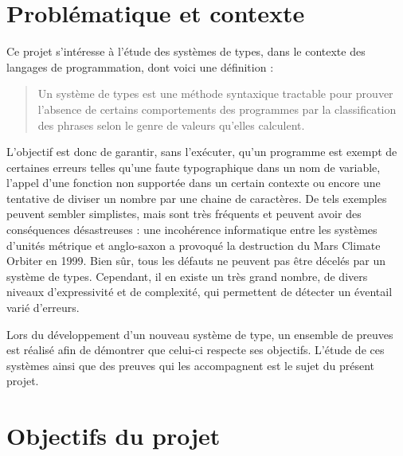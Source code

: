 \documentclass[a4paper, oneside, 12pt, titlepage]{article}
\begin{document}
\pagestyle{empty}
\tableofcontents

\cleardoublepage
{}

\section{Problématique et contexte}


Ce projet s'intéresse à l'étude des systèmes de types, dans le contexte des langages de
programmation, dont voici une définition \cite{pierce2002} :

\begin{quotation}
  Un système de types est une méthode syntaxique tractable pour prouver l'absence de certains
  comportements des programmes par la classification des phrases selon le genre de valeurs qu'elles
  calculent.
\end{quotation}

L'objectif est donc de garantir, sans l'exécuter, qu'un programme est exempt de certaines erreurs
telles qu'une faute typographique dans un nom de variable, l'appel d'une fonction non supportée dans
un certain contexte ou encore une tentative de diviser un nombre par une chaine de caractères. De
tels exemples peuvent sembler simplistes, mais sont très fréquents et peuvent avoir des conséquences
désastreuses : une incohérence informatique entre les systèmes d'unités métrique et anglo-saxon a
provoqué la destruction du Mars Climate Orbiter en 1999. Bien sûr, tous les défauts ne peuvent pas
être décelés par un système de types. Cependant, il en existe un très grand nombre, de divers
niveaux d'expressivité et de complexité, qui permettent de détecter un éventail varié d'erreurs.

Lors du développement d'un nouveau système de type, un ensemble de preuves est réalisé afin de
démontrer que celui-ci respecte ses objectifs. L'étude de ces systèmes ainsi que des
preuves qui les accompagnent est le sujet du présent projet.

\section{Objectifs du projet}

\end{document}
